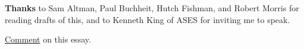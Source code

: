 \textbf{Thanks}
                  to Sam Altman, Paul Buchheit, Hutch Fishman, and Robert Morris
                  for reading drafts of this, and to Kenneth King of ASES for
                  inviting me to speak.


                  \href{http://news.ycombinator.com/item?id=17947}{Comment}
                  on this essay.


              
            
          
            
              
                


                  
              
            
          
